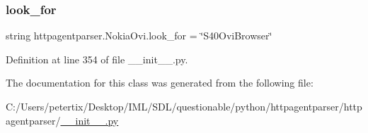 \subsubsection{\texorpdfstring{look\+\_\+for}{look\_for}}
{\footnotesize\ttfamily string httpagentparser.\+Nokia\+Ovi.\+look\+\_\+for = \char`\"{}S40\+Ovi\+Browser\char`\"{}\hspace{0.3cm}{\ttfamily [static]}}



Definition at line 354 of file \+\_\+\+\_\+init\+\_\+\+\_\+.\+py.



The documentation for this class was generated from the following file\+:\begin{DoxyCompactItemize}
\item 
C\+:/\+Users/petertix/\+Desktop/\+I\+M\+L/\+S\+D\+L/questionable/python/httpagentparser/httpagentparser/\hyperlink{____init_____8py}{\+\_\+\+\_\+init\+\_\+\+\_\+.\+py}\end{DoxyCompactItemize}
